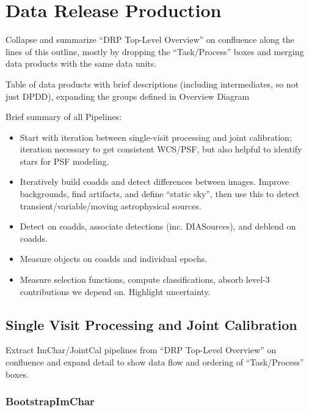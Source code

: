 \section{Data Release Production}
\label{sec:drp}

\begin{note}
Collapse and summarize ``DRP Top-Level Overview'' on confluence along the lines of this outline, mostly by dropping the ``Task/Process'' boxes and merging data products with the same data units.
\end{note}

\begin{note}
Table of data products with brief descriptions (including intermediates, so not just DPDD), expanding the groups defined in Overview Diagram
\end{note}

Brief summary of all Pipelines:
\begin{itemize}
\item Start with iteration between single-visit processing and joint calibration; iteration necessary to get consistent WCS/PSF, but also helpful to identify stars for PSF modeling.
\item Iteratively build coadds and detect differences between images.  Improve backgrounds, find artifacts, and define ``static sky'', then use this to detect transient/variable/moving astrophysical sources.
\item Detect on coadds, associate detections (inc. DIASources), and deblend on coadds.
\item Measure objects on coadds and individual epochs.
\item Measure selection functions, compute classifications, absorb level-3 contributions we depend on.  Highlight uncertainty.
\end{itemize}

\subsection{Single Visit Processing and Joint Calibration}

\begin{note}
Extract ImChar/JointCal pipelines from ``DRP Top-Level Overview'' on confluence and expand detail to show data flow and ordering of ``Task/Process'' boxes.
\end{note}

\subsubsection{BootstrapImChar}
